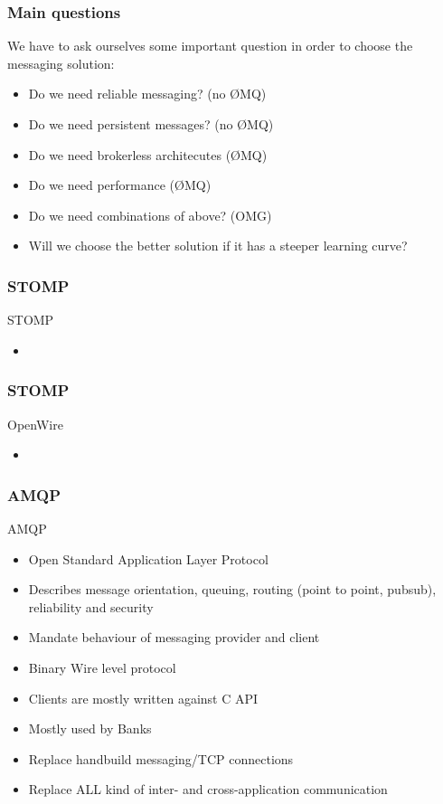 \documentclass[serif,mathserif]{beamer}
\begin{document}
\begin{frame}
\frametitle{Main questions}
We have to ask ourselves some important question in order to choose the messaging solution:
\begin{itemize}
  \item Do we need reliable messaging? (no \O MQ) 
  \item Do we need persistent messages? (no \O MQ)
  \item Do we need brokerless architecutes (\O MQ)
  \item Do we need performance (\O MQ)
  \item Do we need combinations of above? (OMG)
  \item Will we choose the better solution if it has a steeper learning curve?
\end{itemize}
\end{frame}

\begin{frame}
\frametitle{STOMP}
STOMP
\begin{itemize}
  \item 
\end{itemize}
\end{frame}

\begin{frame}
\frametitle{STOMP}
OpenWire
\begin{itemize}
  \item 
\end{itemize}
\end{frame}

\begin{frame}
\frametitle{AMQP}
AMQP
\begin{itemize}
  \item Open Standard Application Layer Protocol
  \item Describes message orientation, queuing, routing (point to point,
  pubsub), reliability and security
  \item Mandate behaviour of messaging provider and client
  \item Binary Wire level protocol
  \item Clients are mostly written against C API
  \item Mostly used by Banks
  \item Replace handbuild messaging/TCP connections
  \item Replace ALL kind of inter- and cross-application communication
\end{itemize}
\end{frame}
\end{document}
